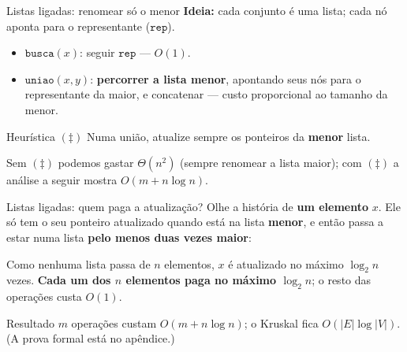 \documentclass[aspectratio=169,10pt]{beamer}
\newcommand{\Busca}{\mathtt{busca}}
\newcommand{\Uniao}{\mathtt{uniao}}
\begin{document}
\begin{frame}[t]{Listas ligadas: renomear só o menor}
  \small
  \textbf{Ideia:} cada conjunto é uma lista; cada nó aponta para o
  representante ($\mathtt{rep}$).
  \begin{itemize}
  \item $\Busca(x)$: seguir $\mathtt{rep}$ --- $O(1)$.
  \item $\Uniao(x,y)$: \textbf{percorrer a lista menor}, apontando seus
    nós para o representante da maior, e concatenar --- custo
    proporcional ao tamanho da menor.
  \end{itemize}

  \medskip
  \begin{block}{Heurística $(\ddag)$}
    Numa união, atualize sempre os ponteiros da \textbf{menor} lista.
  \end{block}

  \medskip
  Sem $(\ddag)$ podemos gastar $\Theta(n^2)$ (sempre renomear a lista
  maior); com $(\ddag)$ a análise a seguir mostra $O(m+n\log n)$.
\end{frame}

\begin{frame}[t]{Listas ligadas: quem paga a atualização?}
  \small
  Olhe a história de \textbf{um elemento} $x$.  Ele só tem o seu ponteiro
  atualizado quando está na lista \textbf{menor}, e então passa a estar
  numa lista \textbf{pelo menos duas vezes maior}:

  \medskip
  \centering

  \medskip
  \raggedright
  Como nenhuma lista passa de $n$ elementos, $x$ é atualizado no máximo
  $\log_2 n$ vezes.  \textbf{Cada um dos $n$ elementos paga no máximo
    $\log_2 n$}; o resto das operações custa $O(1)$.

  \begin{block}{Resultado}
    $m$ operações custam $O(m+n\log n)$; o Kruskal fica
    $O(|E|\log|V|)$.  (A prova formal está no apêndice.)
  \end{block}
\end{frame}
\end{document}

